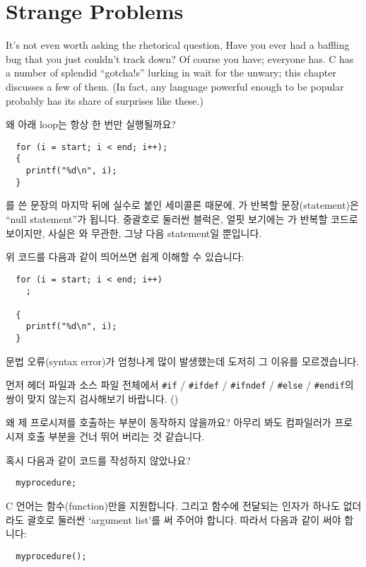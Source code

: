 \chapter{Strange Problems}	\label{chap:sproblem}

It's not even worth asking the rhetorical question, Have you ever had a
baffling bug that you just couldn't track down?  Of course you have;
everyone has.  C has a number of splendid ``gotcha!s'' lurking in wait for
the unwary;  this chapter discusses a few of them.  (In fact, any language
powerful enough to be popular probably has its share of surprises like these.)

\begin{faq}
	왜 아래 loop는 항상 한 번만 실행될까요?
\begin{verbatim}
  for (i = start; i < end; i++);
  {
    printf("%d\n", i);
  }
\end{verbatim}
\A
	를 쓴 문장의 마지막 뒤에 실수로 붙인 세미콜론 때문에,
        가 반복할 문장(statement)은 ``null statement''가 됩니다.
        중괄호로 둘러싼 블럭은, 얼핏 보기에는 가 반복할 코드로 보이지만,
        사실은 와 무관한, 그냥 다음 statement일 뿐입니다.

\T
	위 코드를 다음과 같이 띄어쓰면 쉽게 이해할 수 있습니다:
\begin{verbatim}
  for (i = start; i < end; i++)
    ;

  {
    printf("%d\n", i);
  }
\end{verbatim}
\end{faq}

\begin{faq}
	문법 오류(syntax error)가 엄청나게 많이 발생했는데 도저히 그
	이유를 모르겠습니다.

\A
	먼저 헤더 파일과 소스 파일 전체에서
	\verb+#if+ / \verb+#ifdef+ / \verb+#ifndef+ / \verb+#else+ / 
        \verb+#endif+의
	쌍이 맞지 않는지 검사해보기 바랍니다.
	()
\end{faq}

\begin{faq}
	왜 제 프로시져를 호출하는 부분이 동작하지 않을까요? 아무리 봐도
	컴파일러가 프로시져 호출 부분을 건너 뛰어 버리는 것 같습니다.

\A
	혹시 다음과 같이 코드를 작성하지 않았나요?
\begin{verbatim}
  myprocedure;
\end{verbatim}
	\noindent
	C 언어는 함수(function)만을 지원합니다.  그리고 함수에 전달되는
	인자가 하나도 없더라도 괄호로 둘러싼 `argument list'를 써 주어야
	합니다.  따라서 다음과 같이 써야 합니다:

\begin{verbatim}
  myprocedure();
\end{verbatim}
\end{faq}

